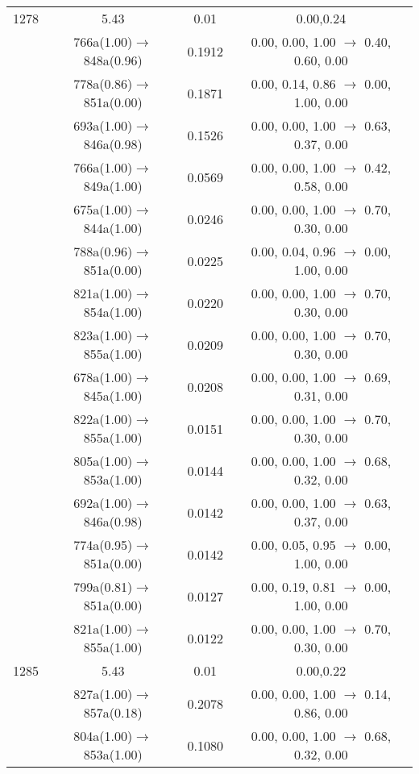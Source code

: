\documentclass[10pt,a4paper]{article}
\begin{document}
\begin{longtable}{c|c|c|c}
 \hline1278 &	 5.43 &	 0.01 &	 0.00,0.24 \\ 
  	& 766a(1.00)$\rightarrow$848a(0.96) &	 0.1912 &	 0.00, 0.00, 1.00 $\rightarrow$ 0.40, 0.60, 0.00 \\ 
 	& 778a(0.86)$\rightarrow$851a(0.00) &	 0.1871 &	 0.00, 0.14, 0.86 $\rightarrow$ 0.00, 1.00, 0.00 \\ 
 	& 693a(1.00)$\rightarrow$846a(0.98) &	 0.1526 &	 0.00, 0.00, 1.00 $\rightarrow$ 0.63, 0.37, 0.00 \\ 
 	& 766a(1.00)$\rightarrow$849a(1.00) &	 0.0569 &	 0.00, 0.00, 1.00 $\rightarrow$ 0.42, 0.58, 0.00 \\ 
 	& 675a(1.00)$\rightarrow$844a(1.00) &	 0.0246 &	 0.00, 0.00, 1.00 $\rightarrow$ 0.70, 0.30, 0.00 \\ 
 	& 788a(0.96)$\rightarrow$851a(0.00) &	 0.0225 &	 0.00, 0.04, 0.96 $\rightarrow$ 0.00, 1.00, 0.00 \\ 
 	& 821a(1.00)$\rightarrow$854a(1.00) &	 0.0220 &	 0.00, 0.00, 1.00 $\rightarrow$ 0.70, 0.30, 0.00 \\ 
 	& 823a(1.00)$\rightarrow$855a(1.00) &	 0.0209 &	 0.00, 0.00, 1.00 $\rightarrow$ 0.70, 0.30, 0.00 \\ 
 	& 678a(1.00)$\rightarrow$845a(1.00) &	 0.0208 &	 0.00, 0.00, 1.00 $\rightarrow$ 0.69, 0.31, 0.00 \\ 
 	& 822a(1.00)$\rightarrow$855a(1.00) &	 0.0151 &	 0.00, 0.00, 1.00 $\rightarrow$ 0.70, 0.30, 0.00 \\ 
 	& 805a(1.00)$\rightarrow$853a(1.00) &	 0.0144 &	 0.00, 0.00, 1.00 $\rightarrow$ 0.68, 0.32, 0.00 \\ 
 	& 692a(1.00)$\rightarrow$846a(0.98) &	 0.0142 &	 0.00, 0.00, 1.00 $\rightarrow$ 0.63, 0.37, 0.00 \\ 
 	& 774a(0.95)$\rightarrow$851a(0.00) &	 0.0142 &	 0.00, 0.05, 0.95 $\rightarrow$ 0.00, 1.00, 0.00 \\ 
 	& 799a(0.81)$\rightarrow$851a(0.00) &	 0.0127 &	 0.00, 0.19, 0.81 $\rightarrow$ 0.00, 1.00, 0.00 \\ 
 	& 821a(1.00)$\rightarrow$855a(1.00) &	 0.0122 &	 0.00, 0.00, 1.00 $\rightarrow$ 0.70, 0.30, 0.00 \\ 
 \hline1285 &	 5.43 &	 0.01 &	 0.00,0.22 \\ 
  	& 827a(1.00)$\rightarrow$857a(0.18) &	 0.2078 &	 0.00, 0.00, 1.00 $\rightarrow$ 0.14, 0.86, 0.00 \\ 
 	& 804a(1.00)$\rightarrow$853a(1.00) &	 0.1080 &	 0.00, 0.00, 1.00 $\rightarrow$ 0.68, 0.32, 0.00 \\ 

\end{longtable}
\end{document}
